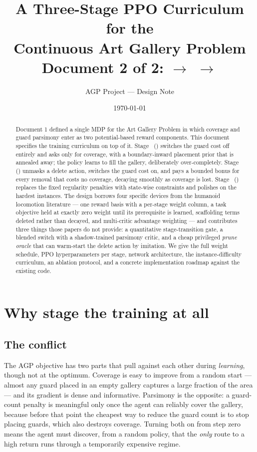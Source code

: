 \documentclass[11pt,a4paper]{article}
\title{\bfseries A Three-Stage PPO Curriculum for the\\ Continuous Art Gallery Problem\\[4pt]
\large Document 2 of 2: \stageI{} $\rightarrow$ \stageII{} $\rightarrow$ \stageIII{}}
\author{AGP Project --- Design Note}
\date{\today}
\begin{document}
\maketitle

\begin{abstract}
\noindent
Document 1 defined a single MDP for the Art Gallery Problem in which coverage and guard
parsimony enter as two potential-based reward components. This document specifies the
training curriculum on top of it. Stage~\stageI{} (\stageI{}) switches the guard cost off
entirely and asks only for coverage, with a boundary-inward placement prior that is
annealed away; the policy learns to fill the gallery, deliberately over-completely.
Stage~\stageII{} (\stageII{}) unmasks a delete action, switches the guard cost on, and pays
a bounded bonus for every removal that costs no coverage, decaying smoothly as coverage is
lost. Stage~\stageIII{} (\stageIII{}) replaces the fixed regularity penalties with
state-wise constraints and polishes on the hardest instances. The design borrows four
specific devices from the humanoid locomotion literature --- one reward basis with a
per-stage weight column, a task objective held at exactly zero weight until its
prerequisite is learned, scaffolding terms deleted rather than decayed, and multi-critic
advantage weighting --- and contributes three things those papers do not provide: a
quantitative stage-transition gate, a blended switch with a shadow-trained parsimony critic,
and a cheap privileged \emph{prune oracle} that can warm-start the delete action by
imitation. We give the full weight schedule, PPO hyperparameters per stage, network
architecture, the instance-difficulty curriculum, an ablation protocol, and a concrete
implementation roadmap against the existing code.
\end{abstract}

\tableofcontents

\section{Why stage the training at all}

\subsection{The conflict}

The AGP objective has two parts that pull against each other during \emph{learning}, though
not at the optimum. Coverage is easy to improve from a random start --- almost any guard
placed in an empty gallery captures a large fraction of the area --- and its gradient is
dense and informative. Parsimony is the opposite: a guard-count penalty is meaningful only
once the agent can reliably cover the gallery, because before that point the cheapest way
to reduce the guard count is to stop placing guards, which also destroys coverage. Turning
both on from step zero means the agent must discover, from a random policy, that the
\emph{only} route to a high return runs through a temporarily expensive regime.
\end{document}
